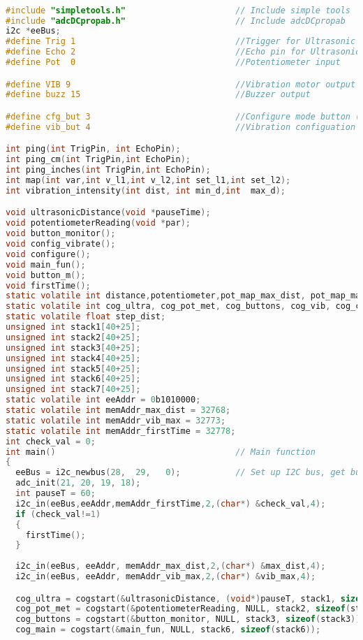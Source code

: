 \documentclass[twoside,11pt,letter]{article}
\begin{document}
\begin{lstlisting}[language=C]

#include "simpletools.h"                      // Include simple tools
#include "adcDCpropab.h"                      // Include adcDCpropab
i2c *eeBus;
#define Trig 1                                //Trigger for Ultrasonic sensor
#define Echo 2                                //Echo pin for Ultrasonic sensor
#define Pot  0                                //Potentiometer input 

#define VIB 9                                 //Vibration motor output
#define buzz 15                               //Buzzer output

#define cfg_but 3                             //Configure mode button (push button)
#define vib_but 4                             //Vibration configuation mode button (push button)

int ping(int TrigPin, int EchoPin);
int ping_cm(int TrigPin,int EchoPin);
int ping_inches(int TrigPin,int EchoPin);
int map(int var,int v_l1,int v_l2,int set_l1,int set_l2);
int vibration_intensity(int dist, int min_d,int  max_d);

void ultrasonicDistance(void *pauseTime);
void potentiometerReading(void *par);
void button_monitor();
void config_vibrate();
void configure();
void main_fun();
void button_m();
void firstTime();
static volatile int distance,potentiometer,pot_map_max_dist, pot_map_max_vib, max_dist, vib_max, config_button, vibrate_button;
static volatile int cog_ultra, cog_pot_met, cog_buttons, cog_vib, cog_cnfg, cog_main, cog_button;
static volatile float step_dist; 
unsigned int stack1[40+25];
unsigned int stack2[40+25];
unsigned int stack3[40+25];
unsigned int stack4[40+25];
unsigned int stack5[40+25];
unsigned int stack6[40+25];
unsigned int stack7[40+25];
static volatile int eeAddr = 0b1010000;
static volatile int memAddr_max_dist = 32768;
static volatile int memAddr_vib_max = 32773;
static volatile int memAddr_firstTime = 32778;
int check_val = 0;
int main()                                    // Main function
{
  eeBus = i2c_newbus(28,  29,   0);           // Set up I2C bus, get bus ID
  adc_init(21, 20, 19, 18);
  int pauseT = 60;
  i2c_in(eeBus,eeAddr,memAddr_firstTime,2,(char*) &check_val,4);
  if (check_val!=1)
  {
    firstTime();
  }
        
  i2c_in(eeBus, eeAddr, memAddr_max_dist,2,(char*) &max_dist,4);
  i2c_in(eeBus, eeAddr, memAddr_vib_max,2,(char*) &vib_max,4);

  cog_ultra = cogstart(&ultrasonicDistance, (void*)pauseT, stack1, sizeof(stack1));
  cog_pot_met = cogstart(&potentiometerReading, NULL, stack2, sizeof(stack2));
  cog_buttons = cogstart(&button_monitor, NULL, stack3, sizeof(stack3));  
  cog_main = cogstart(&main_fun, NULL, stack6, sizeof(stack6));


\end{lstlisting}
\end{document}
